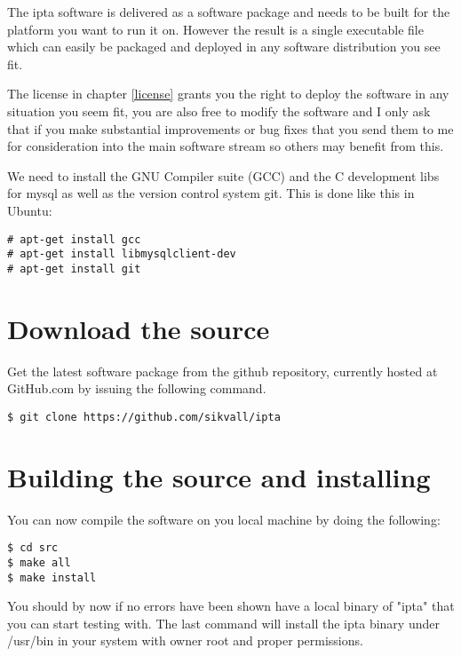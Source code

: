 \documentclass[12pt,a4paper]{report}
\begin{document}
The ipta software is delivered as a software package and needs to be built for the platform you want to run it on. However the result is a single executable file which can easily be packaged and deployed in any software distribution you see fit. 

The license in chapter \ref{license} grants you the right to deploy the software in any situation you seem fit, you are also free to modify the software and I only ask that if you make substantial improvements or bug fixes that you send them to me for consideration into the main software stream so others may benefit from this.

We need to install the GNU Compiler suite (GCC) and the C development libs for mysql as well as the version control system git. This is done like this in Ubuntu:

\begin{verbatim}
# apt-get install gcc
# apt-get install libmysqlclient-dev
# apt-get install git
\end{verbatim}

\section{Download the source}

Get the latest software package from the github repository, currently hosted at GitHub.com by issuing the following command.

\begin{verbatim}
$ git clone https://github.com/sikvall/ipta
\end{verbatim}

\section{Building the source and installing}

You can now compile the software on you local machine by doing the following:

\begin{verbatim}
$ cd src
$ make all
$ make install
\end{verbatim}

You should by now if no errors have been shown have a local binary of "ipta" that you can start testing with. The last command will install the ipta binary under /usr/bin in your system with owner root and proper permissions.
\end{document}
